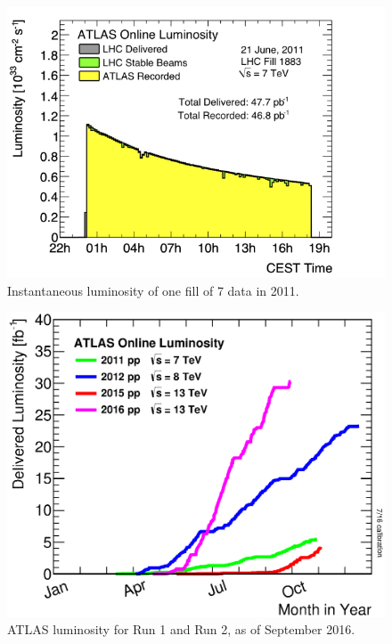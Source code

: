 \begin{centering}
\begin{figure}[!hbt]
\myfloatalign
\includegraphics[width=.90\linewidth]{figures/lhc/lumi1883.jpg}
\caption{Instantaneous luminosity of one fill of 7 \tev data in 2011.}
\label{fig:instlumi}
\end{figure}
\end{centering}

\begin{centering}
\begin{figure}[!hbt]
\myfloatalign
\includegraphics[width=.90\linewidth]{figures/lhc/intlumivsyear.eps}
\caption{ATLAS luminosity for Run 1 and Run 2, as of September 2016.}
\label{fig:lumi_vs_year}
\end{figure} 
\end{centering}

